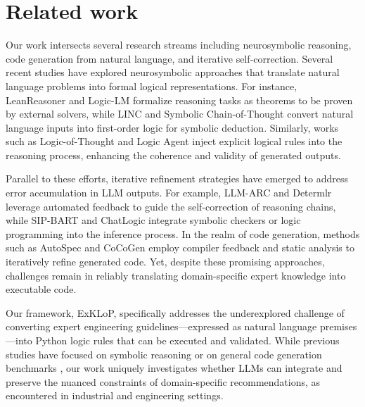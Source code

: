 \section{Related work}
Our work intersects several research streams including neurosymbolic reasoning, code generation from natural language, and iterative self‐correction. Several recent studies have explored neurosymbolic approaches that translate natural language problems into formal logical representations. For instance, LeanReasoner \cite{jiang2024leanreasoner} and Logic-LM \cite{pan2023logic} formalize reasoning tasks as theorems to be proven by external solvers, while LINC \cite{olausson2023linc} and Symbolic Chain-of-Thought \cite{xu2024faithful} convert natural language inputs into first-order logic for symbolic deduction. Similarly, works such as Logic-of-Thought \cite{liu2024logic} and Logic Agent \cite{liu2024logic} inject explicit logical rules into the reasoning process, enhancing the coherence and validity of generated outputs.

Parallel to these efforts, iterative refinement strategies have emerged to address error accumulation in LLM outputs. For example, LLM-ARC \cite{kalyanpur2024llm} and Determlr \cite{sun2024determlr} leverage automated feedback to guide the self-correction of reasoning chains, while SIP-BART \cite{enstrom2024reasoning} and ChatLogic \cite{wang2024chatlogic} integrate symbolic checkers or logic programming into the inference process. In the realm of code generation, methods such as AutoSpec \cite{wen2024enchanting} and CoCoGen \cite{bi2024iterative} employ compiler feedback and static analysis to iteratively refine generated code. Yet, despite these promising approaches, challenges remain in reliably translating domain-specific expert knowledge into executable code.

Our framework, ExKLoP, specifically addresses the underexplored challenge of converting expert engineering guidelines—expressed as natural language premises—into Python logic rules that can be executed and validated. While previous studies have focused on symbolic reasoning \cite{jiang2024leanreasoner, pan2023logic, olausson2023linc, xu2024faithful, liu2024logic, wysocka2024syllobio, dalal-etal-2024-inference,quan-etal-2024-verification,quan-etal-2024-enhancing, meadows-etal-2024-symbolic, quan-etal-2024-verification,meadows2025controllingequationalreasoninglarge} or on general code generation benchmarks \cite{wang2023review, yadav2024pythonsaga}, our work uniquely investigates whether LLMs can integrate and preserve the nuanced constraints of domain-specific recommendations, as encountered in industrial and engineering settings.

